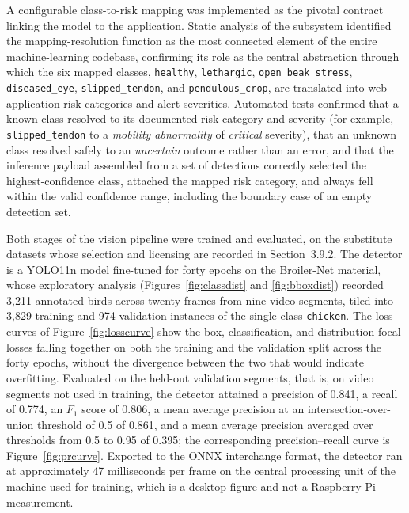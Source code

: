 \documentclass[12pt,a4paper]{report}
\begin{document}
A configurable class-to-risk mapping was implemented as the pivotal contract linking the model to the application. Static analysis of the subsystem identified the mapping-resolution function as the most connected element of the entire machine-learning codebase, confirming its role as the central abstraction through which the six mapped classes, \texttt{healthy}, \texttt{lethargic}, \texttt{open\_beak\_stress}, \texttt{diseased\_eye}, \texttt{slipped\_tendon}, and \texttt{pendulous\_crop}, are translated into web-application risk categories and alert severities. Automated tests confirmed that a known class resolved to its documented risk category and severity (for example, \texttt{slipped\_tendon} to a \emph{mobility abnormality} of \emph{critical} severity), that an unknown class resolved safely to an \emph{uncertain} outcome rather than an error, and that the inference payload assembled from a set of detections correctly selected the highest-confidence class, attached the mapped risk category, and always fell within the valid confidence range, including the boundary case of an empty detection set.

Both stages of the vision pipeline were trained and evaluated, on the substitute datasets whose selection and licensing are recorded in Section~3.9.2. The detector is a YOLO11n model fine-tuned for forty epochs on the Broiler-Net material, whose exploratory analysis (Figures~\ref{fig:classdist} and \ref{fig:bboxdist}) recorded 3{,}211 annotated birds across twenty frames from nine video segments, tiled into 3{,}829 training and 974 validation instances of the single class \texttt{chicken}. The loss curves of Figure~\ref{fig:losscurve} show the box, classification, and distribution-focal losses falling together on both the training and the validation split across the forty epochs, without the divergence between the two that would indicate overfitting. Evaluated on the held-out validation segments, that is, on video segments not used in training, the detector attained a precision of 0.841, a recall of 0.774, an $F_1$ score of 0.806, a mean average precision at an intersection-over-union threshold of 0.5 of 0.861, and a mean average precision averaged over thresholds from 0.5 to 0.95 of 0.395; the corresponding precision--recall curve is Figure~\ref{fig:prcurve}. Exported to the ONNX interchange format, the detector ran at approximately 47 milliseconds per frame on the central processing unit of the machine used for training, which is a desktop figure and not a Raspberry Pi measurement.
\end{document}
